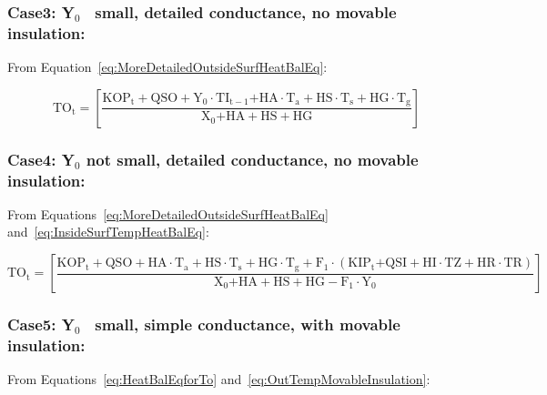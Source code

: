 \subsubsection{Case3: Y\(_{0}\)~ small, detailed conductance, no movable insulation:}\label{case3-yux5f0-small-detailed-conductance-no-movable-insulation}

From Equation~\ref{eq:MoreDetailedOutsideSurfHeatBalEq}:

\begin{equation}
{\mathrm{T}}{{\mathrm{O}}_{\mathrm{t}}}{\mathrm{ = }}\left[ {\frac{{{\mathrm{KO}}{{\mathrm{P}}_{\mathrm{t}}} + {\mathrm{QSO}} + {{\mathrm{Y}}_0}\cdot {\mathrm{T}}{{\mathrm{I}}_{{\mathrm{t - 1}}}}{\mathrm{ + HA}}\cdot {{\mathrm{T}}_{\mathrm{a}}} + {\mathrm{HS}}\cdot {{\mathrm{T}}_{\mathrm{s}}} + {\mathrm{HG}}\cdot {{\mathrm{T}}_{\mathrm{g}}}}}{{{{\mathrm{X}}_{\mathrm{0}}}{\mathrm{ + HA + HS + HG}}}}} \right]{\mathrm{  }}
\end{equation}

\subsubsection{Case4: Y\(_{0}\) not small, detailed conductance, no movable insulation:}\label{case4-yux5f0-not-small-detailed-conductance-no-movable-insulation}

From Equations~\ref{eq:MoreDetailedOutsideSurfHeatBalEq} and~\ref{eq:InsideSurfTempHeatBalEq}:

\begin{equation}
{\mathrm{T}}{{\mathrm{O}}_{\mathrm{t}}}{\mathrm{ = }}\left[ {\frac{{{\mathrm{KO}}{{\mathrm{P}}_{\mathrm{t}}} + {\mathrm{QSO}} + {\mathrm{HA}}\cdot {{\mathrm{T}}_{\mathrm{a}}} + {\mathrm{HS}}\cdot {{\mathrm{T}}_{\mathrm{s}}} + {\mathrm{HG}}\cdot {{\mathrm{T}}_{\mathrm{g}}} + {{\mathrm{F}}_{\mathrm{1}}}\cdot \left( {{\mathrm{KI}}{{\mathrm{P}}_{\mathrm{t}}}{\mathrm{ + QSI + HI}}\cdot {\mathrm{TZ + HR}}\cdot {\mathrm{TR}}} \right)}}{{{{\mathrm{X}}_{\mathrm{0}}}{\mathrm{ + HA + HS + HG - }}{{\mathrm{F}}_1}\cdot {{\mathrm{Y}}_0}}}} \right]{\mathrm{  }}
\end{equation}

\subsubsection{Case5: Y\(_{0}\)~ small, simple conductance, with movable insulation:}\label{case5-yux5f0-small-simple-conductance-with-movable-insulation}

From Equations~\ref{eq:HeatBalEqforTo} and~\ref{eq:OutTempMovableInsulation}:

